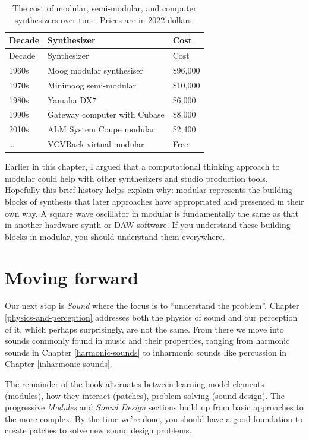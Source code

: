 \documentclass[
]{book}
\begin{document}
\begin{longtable}[]{@{}lll@{}}
\caption{\label{tab:price} The cost of modular, semi-modular, and computer synthesizers over time. Prices are in 2022 dollars.}\tabularnewline
\toprule()
Decade & Synthesizer & Cost \\
\midrule()
\endfirsthead
\toprule()
Decade & Synthesizer & Cost \\
\midrule()
\endhead
1960s & Moog modular synthesiser & \$96,000 \\
1970s & Minimoog semi-modular & \$10,000 \\
1980s & Yamaha DX7 & \$6,000 \\
1990s & Gateway computer with Cubase & \$8,000 \\
2010s & ALM System Coupe modular & \$2,400 \\
\ldots{} & VCVRack virtual modular & Free \\
\bottomrule()
\end{longtable}

Earlier in this chapter, I argued that a computational thinking approach to modular could help with other synthesizers and studio production tools.
Hopefully this brief history helps explain why: modular represents the building blocks of synthesis that later approaches have appropriated and presented in their own way.
A square wave oscillator in modular is fundamentally the same as that in another hardware synth or DAW software.
If you understand these building blocks in modular, you should understand them everywhere.

\hypertarget{moving-forward}{%
\section{Moving forward}\label{moving-forward}}

Our next stop is \emph{Sound} where the focus is to ``understand the problem''.
Chapter \ref{physics-and-perception} addresses both the physics of sound and our perception of it, which perhaps surprisingly, are not the same.
From there we move into sounds commonly found in music and their properties, ranging from harmonic sounds in Chapter \ref{harmonic-sounds} to inharmonic sounds like percussion in Chapter \ref{inharmonic-sounds}.

The remainder of the book alternates between learning model elements (modules), how they interact (patches), problem solving (sound design).
The progressive \emph{Modules} and \emph{Sound Design} sections build up from basic approaches to the more complex.
By the time we're done, you should have a good foundation to create patches to solve new sound design problems.
\end{document}
